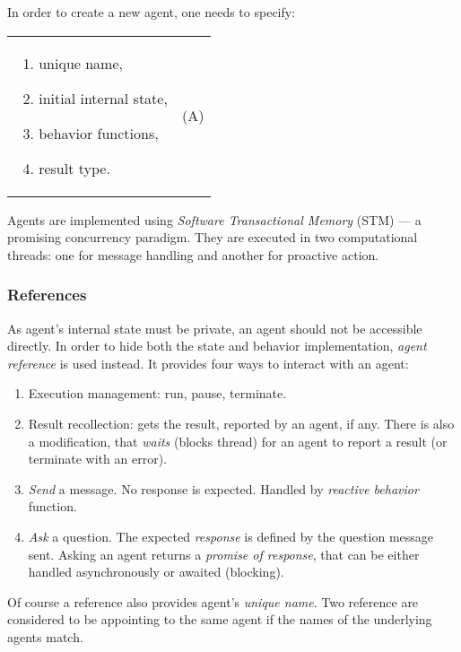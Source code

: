 \documentclass[../ThesisDoc]{subfiles}
\begin{document}
\medskip

\noindent
In order to create a new agent, one needs to specify: \\
\begin{tabularx}{\textwidth}{X c}
  \multicolumn{1}{m{0.4\textwidth}}{
    \begin{enumerate}
      \item unique name,
      \item initial internal state,
      \item behavior functions,
      \item result type.
    \end{enumerate}
  }
&  (A)
\end{tabularx}

\bigskip

\noindent
Agents are implemented using \emph{Software Transactional Memory} (STM)
\cite{STMCode07} --- a promising concurrency paradigm.
They are executed in two computational threads:
one for message handling and another for proactive action.

\subsubsection{References}
As agent's internal state must be private, an agent should not be accessible directly.
In order to hide both the state and behavior implementation, \emph{agent reference}
is used instead. It provides four ways to interact with an agent:
\begin{enumerate}
  \item Execution management: run, pause, terminate.
  \item Result recollection: gets the result, reported by an agent, if any.
        There is also a modification, that \emph{waits} (blocks thread) for an agent
        to report a result (or terminate with an error).
  \item \emph{Send} a message. No response is expected. Handled by
        \emph{reactive behavior} function.
  \item \emph{Ask} a question. The expected \emph{response} is defined by
        the question message sent. Asking an agent returns a \emph{promise of response},
        that can be either handled asynchronously or awaited (blocking).
\end{enumerate}

Of course a reference also provides agent's \emph{unique name}. Two
reference are considered to be appointing to the same agent if the names
of the underlying agents match.
\end{document}
